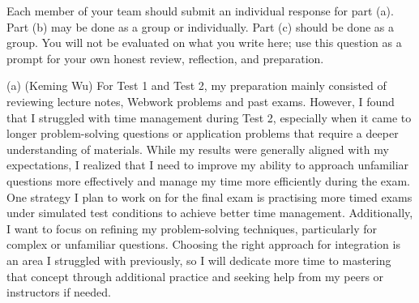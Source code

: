 \documentclass[answers]{exam}
\begin{document}
\begin{questions}

\question Each member of your team should submit an individual response for part (a). Part (b) may be done as a group or individually. Part (c) should be done as a group. You will not be evaluated on what you write here; use this question as a prompt for your own honest review, reflection, and preparation.


\begin{solution}
    (a) (Keming Wu) For Test 1 and Test 2, my preparation mainly consisted of reviewing lecture notes, Webwork problems and past exams. However, I found that I struggled with time management during Test 2, especially when it came to longer problem-solving questions or application problems that require a deeper understanding of materials. While my results were generally aligned with my expectations, I realized that I need to improve my ability to approach unfamiliar questions more effectively and manage my time more efficiently during the exam.
    One strategy I plan to work on for the final exam is practising more timed exams under simulated test conditions to achieve better time management. Additionally, I want to focus on refining my problem-solving techniques, particularly for complex or unfamiliar questions. Choosing the right approach for integration is an area I struggled with previously, so I will dedicate more time to mastering that concept through additional practice and seeking help from my peers or instructors if needed.


\end{solution}
\end{questions}
\end{document}
